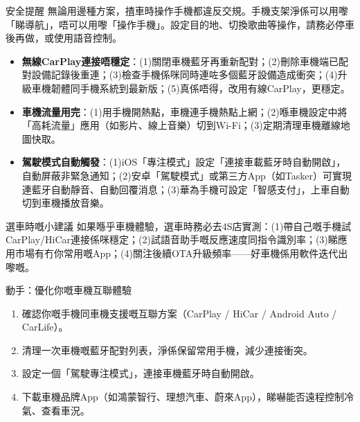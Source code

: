 \begin{tcbwarn}{安全提醒}
無論用邊種方案，揸車時操作手機都違反交規。手機支架淨係可以用嚟「睇導航」，唔可以用嚟「操作手機」。設定目的地、切換歌曲等操作，請務必停車後再做，或使用語音控制。

\end{tcbwarn}


\begin{itemize}
  \item \textbf{無線CarPlay連接唔穩定}：(1)關閉車機藍牙再重新配對；(2)刪除車機端已配對設備記錄後重連；(3)檢查手機係咪同時連咗多個藍牙設備造成衝突；(4)升級車機韌體同手機系統到最新版；(5)真係唔得，改用有線CarPlay，更穩定。
  \item \textbf{車機流量用完}：(1)用手機開熱點，車機連手機熱點上網；(2)喺車機設定中將「高耗流量」應用（如影片、線上音樂）切到Wi-Fi；(3)定期清理車機離線地圖快取。
  \item \textbf{駕駛模式自動觸發}：(1)iOS「專注模式」設定「連接車載藍牙時自動開啟」，自動屏蔽非緊急通知；(2)安卓「駕駛模式」或第三方App（如Tasker）可實現連藍牙自動靜音、自動回覆消息；(3)華為手機可設定「智感支付」，上車自動切到車機播放音樂。
\end{itemize}

\begin{tcbinfo}{選車時嘅小建議}
如果喺乎車機體驗，選車時務必去4S店實測：(1)帶自己嘅手機試CarPlay/HiCar連接係咪穩定；(2)試語音助手嘅反應速度同指令識別率；(3)睇應用市場有冇你常用嘅App；(4)關注後續OTA升級頻率——好車機係用軟件迭代出嚟嘅。

\end{tcbinfo}

\begin{tcbpractice}{動手：優化你嘅車機互聯體驗}
\begin{enumerate}
  \item 確認你嘅手機同車機支援嘅互聯方案（CarPlay / HiCar / Android Auto / CarLife）。
  \item 清理一次車機嘅藍牙配對列表，淨係保留常用手機，減少連接衝突。
  \item 設定一個「駕駛專注模式」，連接車機藍牙時自動開啟。
  \item 下載車機品牌App（如鴻蒙智行、理想汽車、蔚來App），睇嚇能否遠程控制冷氣、查看車況。
\end{enumerate}

\end{tcbpractice}

